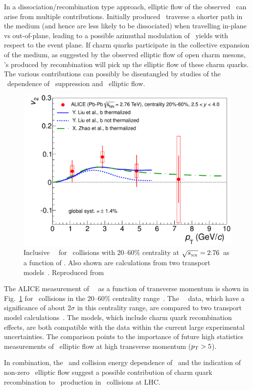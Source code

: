 In a dissociation/recombination type approach, elliptic flow of the observed \jpsi\ can 
arise from multiple contributions. Initially produced \jpsi\ traverse a shorter path 
in the medium (and hence are less likely to be dissociated) when travelling in-plane vs 
out-of-plane, leading to a possible azimuthal modulation of \jpsi\ yields with respect 
to the event plane. If charm quarks participate in the collective expansion of the medium, as
suggested by the observed elliptic flow of open charm mesons, \jpsi's produced by recombination will
pick up the elliptic flow of these charm quarks. The various contributions can possibly be disentangled 
by studies of the \pT\ dependence of \jpsi\ suppression and \jpsi\ elliptic flow.

\begin{figure}
\begin{center}
\includegraphics[width=0.49\linewidth]{qqbarfigures/prl_fig4-eps-converted-to.pdf}
\caption{\label{fig:GR:v2ptcomp} Inclusive \jpsi\ \vtwo\
for \PbPb\ collisions with 20--60\% centrality at $\sqrt{s_{_{\rm NN}}} = 2.76$\TeV\ as a function of \pT.
Also shown are calculations from two transport models~\cite{Liu:2009gx,Zhao:2012gc}. 
Reproduced from~\cite{ALICE:2013xna}}
\end{center}
\end{figure}
The ALICE measurement of \jpsi\ \vtwo\ as a function of transverse momentum is 
shown in Fig.~\ref{fig:GR:v2ptcomp} for \PbPb\ collisions in the 20--60\% 
centrality range~\cite{ALICE:2013xna}.
The \jpsi\ \vtwo\ data, which have a significance of about 2$\sigma$ in this centrality range, 
are compared to two transport model calculations~\cite{Liu:2009gx,Zhao:2012gc}. 
The models, which include charm quark recombination effects,
are both compatible with the data within the current large experimental uncertainties. 
The comparison points to the importance of future high statistics measurements 
of \jpsi\ elliptic flow at high transverse momentum ($\mbox{$p_{\mathrm{T}}$} > 5$\GeVc).

In combination, the \pT\ and collision energy dependence of \jpsi \Raa\ and 
the indication of non-zero \jpsi\ elliptic flow suggest a possible  
contribution of charm quark recombination to \jpsi\ production in \PbPb\ collisions
at LHC.

